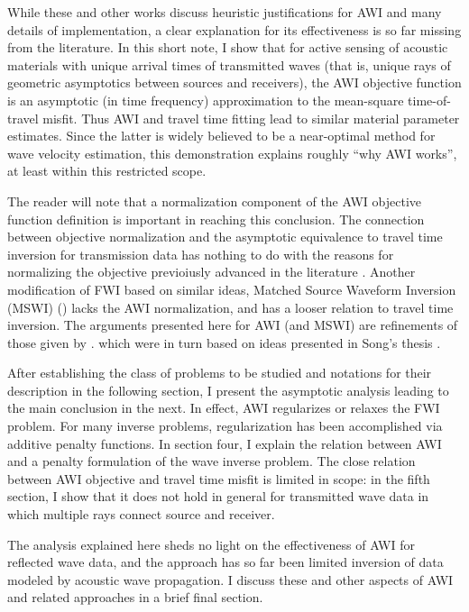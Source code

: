 While these and other works discuss heuristic justifications for AWI and
many details of implementation, a clear explanation for its effectiveness is 
so far missing from the literature. In this short note, I show that
for active sensing of acoustic materials with unique arrival times of
transmitted waves
(that is, unique rays of geometric asymptotics between sources and
receivers), the AWI objective function is an asymptotic (in time
frequency) approximation to the
mean-square time-of-travel misfit. Thus AWI and travel time fitting
lead to similar material parameter estimates. Since the latter is
widely believed to be a near-optimal method for wave velocity
estimation, this demonstration explains roughly ``why AWI works'', at
least within this restricted scope.

The reader will
note that a normalization component of the AWI objective function
definition is 
important in reaching this conclusion. The connection between
objective normalization and the asymptotic equivalence to travel time
inversion for transmission data has nothing to do with
the reasons for normalizing the objective previoiusly advanced in the
literature \cite[]{Warner:16,LiAlkhalifah:21}. Another modification of
FWI based on similar ideas, Matched Source Waveform Inversion (MSWI)
(\cite{HuangSymes2015SEG,HuangSymes:Geo17}) lacks the AWI normalization,
and has a looser relation to travel time inversion. The arguments
presented here for AWI (and MSWI) are refinements of those given by
\cite{HuangSymes:Geo17}. which were in turn based on ideas presented in Song's thesis
\cite[]{Song:94c}.

After establishing the class of problems to be studied and notations
for their description in the following section, I present the
asymptotic analysis leading to the main conclusion in the next. In
effect, AWI regularizes or relaxes the FWI problem. For many inverse
problems, regularization has been accomplished via additive penalty
functions. In section four, I explain the relation between AWI and a
penalty formulation of the wave inverse problem. The
close relation between AWI objective and travel time misfit is limited
in scope: in the fifth section, I show that it does not hold in
general for transmitted wave data in which multiple rays connect
source and receiver. 

The analysis explained here sheds no light on the effectiveness of AWI
for reflected wave data, and the approach has so far been limited
inversion of data modeled by acoustic wave propagation. I discuss
these and other aspects of AWI and related approaches in a brief final
section.

